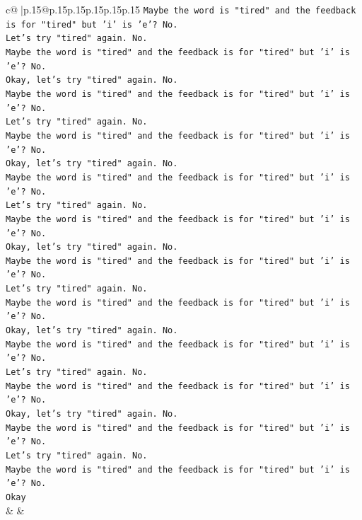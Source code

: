 \documentclass{article}
\begin{document}
{\begin{supertabular}{c@{$\;$}|p{.15\linewidth}@{}p{.15\linewidth}p{.15\linewidth}p{.15\linewidth}p{.15\linewidth}p{.15\linewidth}}
{{{\texttt{Maybe the word is "tired" and the feedback is for "tired" but 'i' is 'e'? No.} \\
\texttt{Let's try "tired" again. No.} \\
\texttt{Maybe the word is "tired" and the feedback is for "tired" but 'i' is 'e'? No.} \\
\texttt{Okay, let's try "tired" again. No.} \\
\texttt{Maybe the word is "tired" and the feedback is for "tired" but 'i' is 'e'? No.} \\
\texttt{Let's try "tired" again. No.} \\
\texttt{Maybe the word is "tired" and the feedback is for "tired" but 'i' is 'e'? No.} \\
\texttt{Okay, let's try "tired" again. No.} \\
\texttt{Maybe the word is "tired" and the feedback is for "tired" but 'i' is 'e'? No.} \\
\texttt{Let's try "tired" again. No.} \\
\texttt{Maybe the word is "tired" and the feedback is for "tired" but 'i' is 'e'? No.} \\
\texttt{Okay, let's try "tired" again. No.} \\
\texttt{Maybe the word is "tired" and the feedback is for "tired" but 'i' is 'e'? No.} \\
\texttt{Let's try "tired" again. No.} \\
\texttt{Maybe the word is "tired" and the feedback is for "tired" but 'i' is 'e'? No.} \\
\texttt{Okay, let's try "tired" again. No.} \\
\texttt{Maybe the word is "tired" and the feedback is for "tired" but 'i' is 'e'? No.} \\
\texttt{Let's try "tired" again. No.} \\
\texttt{Maybe the word is "tired" and the feedback is for "tired" but 'i' is 'e'? No.} \\
\texttt{Okay, let's try "tired" again. No.} \\
\texttt{Maybe the word is "tired" and the feedback is for "tired" but 'i' is 'e'? No.} \\
\texttt{Let's try "tired" again. No.} \\
\texttt{Maybe the word is "tired" and the feedback is for "tired" but 'i' is 'e'? No.} \\
\texttt{Okay} \\
            }
        }
    }
    & & \\ \\


\end{supertabular}}
\end{document}
